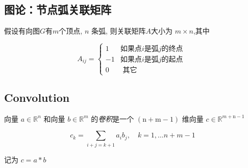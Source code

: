 \subsection{图论：节点弧关联矩阵}

\begin{definition}[关联矩阵]
   假设有向图$G$有$m$个顶点,  $ n $ 条弧, 则关联矩阵$A$大小为 $ m \times n $,其中 

   $$ A_{i j}=\left\{\begin{array}{ll}1 & \text{如果点} i \text{是弧} j \text{的终点 } \\ -1 & \text {如果点}i \text{是弧}j \text{的起点} \\ 0 & \text { 其它 }\end{array}\right. $$
\end{definition}

\subsection{Convolution}

\begin{definition}[一维卷积]
    向量 $ a \in \mathbb{R}^{n} $ 和向量 $ b \in \mathbb{R}^{m} $ 的\textit{卷积}是一个 $ (\mathrm{n}+\mathrm{m}-1) $ 维向量 $ c \in \mathbb{R}^{m+\mathrm{n}-1} $

    $$ c_{k}=\sum_{i+j=k+1} a_{i} b_{j}, \quad k=1, \ldots n+m-1 $$

    记为 $ c=a * b$
\end{definition}

